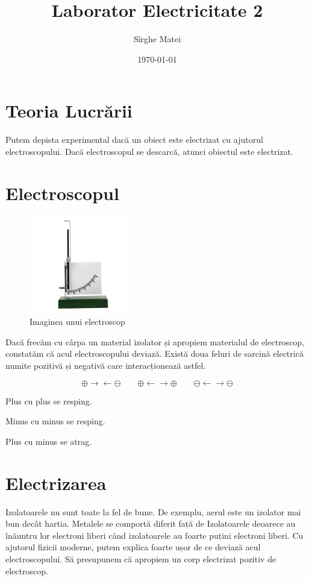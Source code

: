 \documentclass[12pt]{article}
\title{\bfseries Laborator Electricitate 2}
\author{Sîrghe Matei}
\date{\today}
\begin{document}
\maketitle

\section{Teoria Lucrării}
Putem depista experimental dacă un obiect este electrizat cu ajutorul electroscopului. Dacă electroscopul se descarcă, atunci obiectul este electrizat.

\section{Electroscopul}

\begin{figure} %
    \centering
    \includegraphics[width=0.38\textwidth]{electroscop.png} %
    \caption{Imaginea unui electroscop}
    \label{fig:electroscop}
\end{figure}

Dacă frecăm cu cârpa un material izolator și apropiem materialul de electroscop, constatăm că acul electroscopului deviază. Există doua feluri
de sarcină electrică numite pozitivă și negativă care interacționează astfel.

\[
\oplus \rightarrow \leftarrow \ominus \quad 
\quad \oplus \leftarrow \rightarrow \oplus \quad 
\quad \ominus \leftarrow \rightarrow \ominus
\]


Plus cu plus se resping.

Minus cu minus se resping.

Plus cu minus se atrag.
\section{Electrizarea}
Izolatoarele nu sunt toate la fel de bune. De exemplu, aerul este un izolator mai bun decât hartia. Metalele se comportă diferit față de Izolatoarele
deoarece au înăuntru lor electroni liberi când izolatoarele au foarte puțini electroni liberi.
Cu ajutorul fizicii moderne, putem explica foarte ușor de ce deviază acul electroscopului. Să presupunem că apropiem un corp electrizat pozitiv
de electroscop. 
\end{document}
